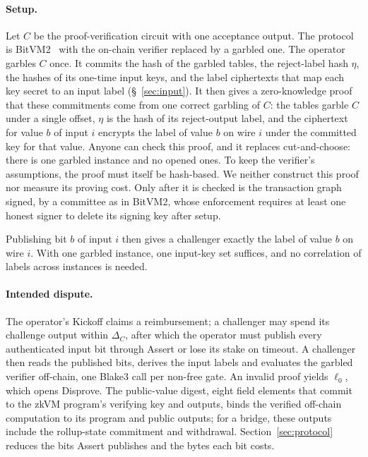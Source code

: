 \documentclass[11pt]{article}
\begin{document}
\paragraph{Setup.} Let $C$ be the proof-verification circuit with one
acceptance output. The protocol is BitVM2~\cite{laa25bitvm2} with the
on-chain verifier replaced by a garbled one. The operator garbles $C$ once.
It commits the hash of the garbled tables, the reject-label hash $\eta$, the
hashes of its one-time input keys, and the label ciphertexts that map each
key secret to an input label (\S~\ref{sec:input}). It then gives a
zero-knowledge proof that these commitments come from one correct garbling
of $C$: the tables garble $C$ under a single offset, $\eta$ is the hash of
its reject-output label, and the ciphertext for value $b$ of input $i$
encrypts the label of value $b$ on wire $i$ under the committed key for that
value. Anyone can check this proof, and it replaces cut-and-choose: there is
one garbled instance and no opened ones. To keep the verifier's assumptions,
the proof must itself be hash-based. We neither construct this proof nor
measure its proving cost. Only after it is checked is the transaction graph
signed, by a committee as in BitVM2, whose enforcement requires at least one
honest signer to delete its signing key after setup.

Publishing bit $b$ of input $i$ then gives a challenger exactly the label of
value $b$ on wire $i$. With one garbled instance, one input-key set suffices,
and no correlation of labels across instances is needed.

\paragraph{Intended dispute.} The operator's Kickoff claims a reimbursement;
a challenger may spend its challenge output within $\Delta_C$, after which the
operator must publish every authenticated input bit through Assert or lose
its stake on timeout. A challenger then reads the published bits, derives
the input labels and evaluates the garbled verifier off-chain, one
Blake3 call per non-free gate. An
invalid proof yields $\ell_0$, which opens
Disprove. The public-value digest, eight field elements that commit to the zkVM program's verifying key and outputs, binds the verified off-chain computation
to its program and public outputs; for a bridge, these outputs include the
rollup-state commitment and withdrawal. Section~\ref{sec:protocol} reduces
the bits Assert publishes and the bytes each bit costs.
\end{document}
